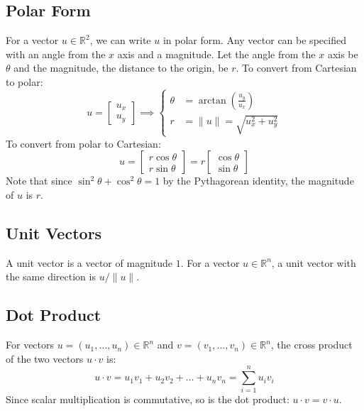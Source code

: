 \documentclass{article}
\begin{document}
\subsection{Polar Form}
For a vector $u\in\mathbb R^2$, we can write $u$ in polar form. Any vector can be specified with an angle from the $x$ axis and a magnitude. Let the angle from the $x$ axis be $\theta$ and the magnitude, the distance to the origin, be $r$. To convert from Cartesian to polar:
\begin{equation*}
    u=\begin{bmatrix}
		u_x \\ u_y
    \end{bmatrix}
	\implies \left\{\begin{aligned}
		\theta&=\arctan\left(\frac{u_y}{u_x}\right) \\
		r&=\lVert u \rVert =\sqrt{u_x^2+u_y^2}
	\end{aligned}\right.
\end{equation*}
To convert from polar to Cartesian:
\begin{equation*}
    u=\begin{bmatrix}
		r\cos\theta \\ r\sin\theta
    \end{bmatrix}
    =r\begin{bmatrix}
		\cos\theta \\ \sin\theta
    \end{bmatrix}
\end{equation*}
Note that since $\sin^2\theta+\cos^2\theta=1$ by the Pythagorean identity, the magnitude of $u$ is $r$.

\subsection{Unit Vectors}

A unit vector is a vector of magnitude $1$. For a vector $u\in\mathbb R^n$, a unit vector with the same direction is $u/\lVert u \rVert $.

\subsection{Dot Product}
For vectors $u=(u_1,\ldots,u_n)\in\mathbb R^n$ and $v=(v_1,\ldots,v_n)\in\mathbb R^n$, the cross product of the two vectors $u\cdot v$ is:
\begin{equation*}
    u\cdot v=u_1v_1+u_2v_2+\ldots+u_nv_n=\sum_{i=1}^{n}u_iv_i
\end{equation*}
Since scalar multiplication is commutative, so is the dot product: $u\cdot v=v\cdot u$.
\end{document}

